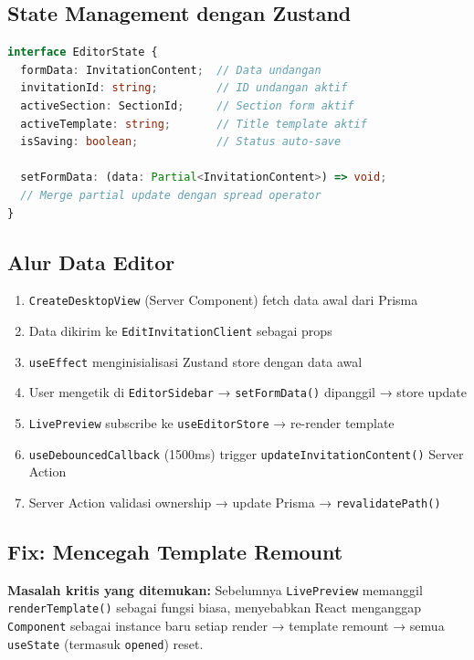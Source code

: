 \documentclass[12pt,a4paper]{article}
\begin{document}
\subsection{State Management dengan Zustand}

\begin{lstlisting}[language=typescript, caption=useEditorStore State]
interface EditorState {
  formData: InvitationContent;  // Data undangan
  invitationId: string;         // ID undangan aktif
  activeSection: SectionId;     // Section form aktif
  activeTemplate: string;       // Title template aktif
  isSaving: boolean;            // Status auto-save

  setFormData: (data: Partial<InvitationContent>) => void;
  // Merge partial update dengan spread operator
}
\end{lstlisting}

\subsection{Alur Data Editor}

\begin{enumerate}
  \item \texttt{CreateDesktopView} (Server Component) fetch data awal dari Prisma
  \item Data dikirim ke \texttt{EditInvitationClient} sebagai props
  \item \texttt{useEffect} menginisialisasi Zustand store dengan data awal
  \item User mengetik di \texttt{EditorSidebar} → \texttt{setFormData()} dipanggil → store update
  \item \texttt{LivePreview} subscribe ke \texttt{useEditorStore} → re-render template
  \item \texttt{useDebouncedCallback} (1500ms) trigger \texttt{updateInvitationContent()} Server Action
  \item Server Action validasi ownership → update Prisma → \texttt{revalidatePath()}
\end{enumerate}

\subsection{Fix: Mencegah Template Remount}

\textbf{Masalah kritis yang ditemukan:} Sebelumnya \texttt{LivePreview} memanggil
\texttt{renderTemplate()} sebagai fungsi biasa, menyebabkan React menganggap
\texttt{Component} sebagai instance baru setiap render → template remount →
semua \texttt{useState} (termasuk \texttt{opened}) reset.
\end{document}
